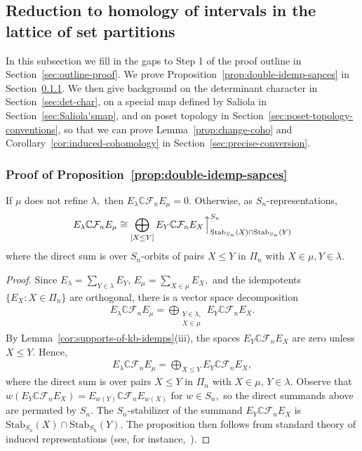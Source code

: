 \documentclass[ALCO, Unicode]{cedram}
\def\C{{\mathbb{C}}}
\def\stab{\mathrm{Stab}}
\begin{document}
\subsection{Reduction to homology of intervals in the lattice of set partitions}\label{sec:poset-top}
In this subsection we fill in the gaps to Step 1 of the proof outline in Section~\ref{sec:outline-proof}. We prove Proposition~\ref{prop:double-idemp-sapces} in Section~\ref{subsubsec:prop5.2proof}. We then give background on the determinant character in Section~\ref{sec:det-char}, on a special map defined by Saliola in Section~\ref{sec:Saliola'smap}, and on poset topology in Section~\ref{sec:poset-topology-conventions}, so that we can prove Lemma~\ref{prop:change-coho} and Corollary~\ref{cor:induced-cohomology} in Section~\ref{sec:precise-conversion}.


\subsubsection{Proof of Proposition~\ref{prop:double-idemp-sapces}} \label{subsubsec:prop5.2proof}

\begin{prop}\label{prop:double-idemp-sapces}
    If $\mu$ does not refine $\lambda,$ then $E_\lambda \C \mathcal{F}_n E_\mu = 0.$ Otherwise, as $S_n$-representations,
    \begin{align*}
        E_{\lambda}\C \mathcal{F}_nE_{\mu} \cong \bigoplus_{ [X \leq Y]} E_Y \C \mathcal{F}_n E_X\Big\uparrow_{\stab_{S_n}(X) \cap \stab_{S_n}(Y)}^{S_n}
    \end{align*}
     where the direct sum is over $S_n$-orbits of pairs $X \leq Y$ in $\Pi_n$ with $X \in \mu, Y \in \lambda.$
\end{prop}

\begin{proof}
    Since $E_\lambda = \sum_{Y \in \lambda} E_Y$, $E_\mu = \sum_{X \in \mu}E_X,$ and the idempotents \mbox{$\{E_X: X \in \Pi_n\}$} are orthogonal, there is a vector space decomposition 
    \begin{align*}
        E_\lambda \C \mathcal{F}_n E_\mu = \bigoplus_{\substack{Y \in \lambda, \\ X \in \mu}} E_Y \C \mathcal{F}_n E_X. 
    \end{align*} By Lemma~\ref{cor:supports-of-kb-idemps}(iii), the spaces $E_Y \C \mathcal{F}_n E_X$ are zero unless $X \leq Y.$ Hence,
    \begin{align*}
        E_\lambda \C \mathcal{F}_n E_\mu = \bigoplus_{X \leq Y} E_Y \C \mathcal{F}_n E_X, 
    \end{align*}
    where the direct sum is over pairs $X \leq Y$ in $\Pi_n$ with $X \in \mu$, $Y \in \lambda.$ Observe that $w\left(E_Y \C \mathcal{F}_n E_X\right) = E_{w(Y)} \C \mathcal{F}_n E_{w(X)}$ for $w \in S_n,$ so the direct summands above are permuted by $S_n.$ The $S_n$-stabilizer of the summand $E_Y \C \mathcal{F}_nE_X$ is $\stab_{S_n}(X) \cap \stab_{S_n}(Y).$ The proposition then follows from standard theory of induced representations (see, for instance,~\cite[Proposition 4.3.2]{webbrepntheory}).
\end{proof}
\end{document}
